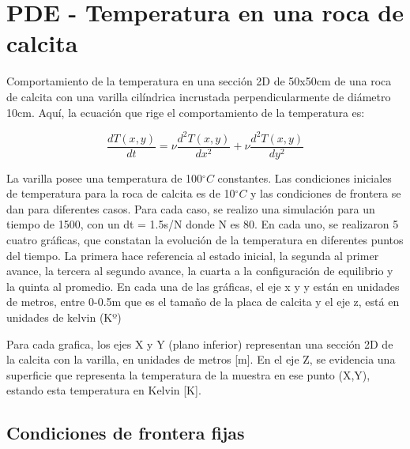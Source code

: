 \documentclass{article}
\begin{document}
\section*{PDE - Temperatura en una roca de calcita}

Comportamiento de la temperatura en una sección 2D de 50x50cm de una roca de calcita con una varilla cilíndrica incrustada perpendicularmente de diámetro 10cm. Aquí, la ecuación que rige el comportamiento de la temperatura es:

\begin{equation}
    \frac{dT(x,y)}{dt}=\nu\frac{d^{2}T(x,y)}{dx^{2}}+\nu\frac{d^{2}T(x,y)}{dy^{2}}
\end{equation}

La varilla posee una temperatura de 100$^{\circ}C$ constantes. Las condiciones iniciales de temperatura para la roca de calcita es de 10$^{\circ}C$ y las condiciones de frontera se dan para diferentes casos. Para cada caso, se realizo una simulación para un tiempo de 1500, con un dt = 1.5s/N donde N es 80. En cada uno, se realizaron 5 cuatro gráficas, que constatan la evolución de la temperatura en diferentes puntos del tiempo. La primera hace referencia al estado inicial, la segunda al primer avance, la tercera al segundo avance, la cuarta a la configuración de equilibrio y la quinta al promedio. En cada una de las gráficas, el eje x y y están en unidades de metros, entre 0-0.5m que es el tamaño de la placa de calcita y el eje z, está en unidades de kelvin (Kº)

Para cada grafica, los ejes X y Y (plano inferior) representan una sección 2D de la calcita con la varilla, en unidades de metros [m]. En el eje Z, se evidencia una superficie que representa la temperatura de la muestra en ese punto (X,Y), estando esta temperatura en Kelvin [K]. 

\subsection*{Condiciones de frontera fijas}
\end{document}
